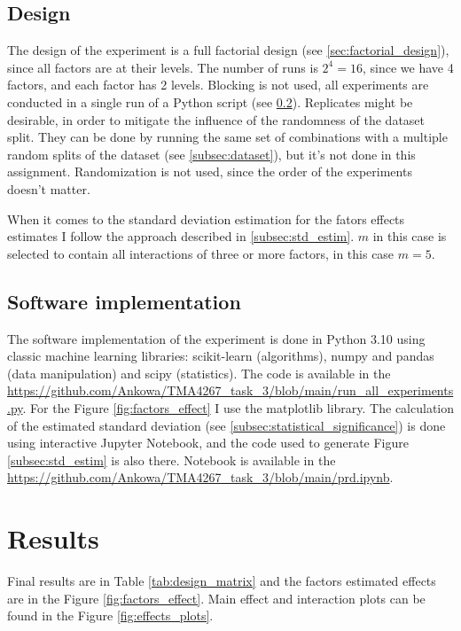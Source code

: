 \documentclass{article}
\begin{document}
\subsection{Design}
The design of the experiment is a full factorial design (see \ref{sec:factorial_design}), since all factors are at their levels. The number of runs is $2^4 = 16$, since we have 4 factors, and each factor has 2 levels. Blocking is not used, all experiments are conducted in a single run of a Python script (see \ref{subsec:software_implementation}). Replicates might be desirable, in order to mitigate the influence of the randomness of the dataset split. They can be done by running the same set of combinations with a multiple random splits of the dataset (see \ref{subsec:dataset}), but it's not done in this assignment. Randomization is not used, since the order of the experiments doesn't matter.

When it comes to the standard deviation estimation for the fators effects estimates I follow the approach described in \ref{subsec:std_estim}. $m$ in this case is selected to contain all interactions of three or more factors, in this case $m=5$.

\subsection{Software implementation}
\label{subsec:software_implementation}

The software implementation of the experiment is done in Python 3.10 using classic machine learning libraries: scikit-learn (algorithms), numpy and pandas (data manipulation) and scipy (statistics). The code is available in the \url{https://github.com/Ankowa/TMA4267_task_3/blob/main/run_all_experiments.py}. For the Figure \ref{fig:factors_effect} I use the matplotlib library. The calculation of the estimated standard deviation (see \ref{subsec:statistical_significance}) is done using interactive Jupyter Notebook, and the code used to generate Figure \ref{subsec:std_estim} is also there. Notebook is available in the \url{https://github.com/Ankowa/TMA4267_task_3/blob/main/prd.ipynb}.

\section{Results}

Final results are in Table \ref{tab:design_matrix} and the factors estimated effects are in the Figure \ref{fig:factors_effect}. Main effect and interaction plots can be found in the Figure \ref{fig:effects_plots}.
\end{document}
